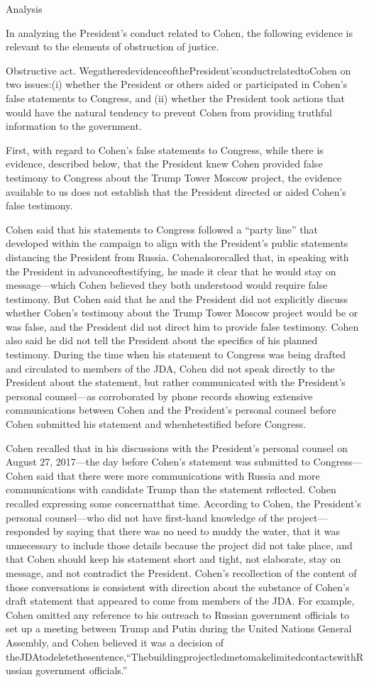 {Analysis

In analyzing the President's conduct related to Cohen, the following evidence is relevant to the elements of obstruction of justice.

Obstructive act.
WegatheredevidenceofthePresident'sconductrelatedtoCohen on two issues:(i) whether the President or others aided or participated in Cohen's false statements to Congress, and (ii) whether the President took actions that would have the natural tendency to prevent Cohen from providing truthful information to the government.

First, with regard to Cohen's false statements to Congress, while there is evidence, described below, that the President knew Cohen provided false testimony to Congress about the Trump Tower Moscow project, the evidence available to us does not establish that the President directed or aided Cohen's false testimony.

Cohen said that his statements to Congress followed a “party line” that developed within the campaign to align with the President's public statements distancing the President from Russia.
Cohenalsorecalled that, in speaking with the President in advanceoftestifying, he made it clear that he would stay on message—which Cohen believed they both understood would require false testimony.
But Cohen said that he and the President did not explicitly discuss whether Cohen's testimony about the Trump Tower Moscow project would be or was false, and the President did not direct him to provide false testimony.
Cohen also said he did not tell the President about the specifics of his planned testimony.
During the time when his statement to Congress was being drafted and circulated to members of the JDA, Cohen did not speak directly to the President about the statement, but rather communicated with the President's personal counsel—as corroborated by phone records showing extensive communications between Cohen and the President's personal counsel before Cohen submitted his statement and whenhetestified before Congress.

Cohen recalled that in his discussions with the President's personal counsel on August 27, 2017—the day before Cohen's statement was submitted to Congress—Cohen said that there were more communications with Russia and more communications with candidate Trump than the statement reflected.
Cohen recalled expressing some concernatthat time.
According to Cohen, the President's personal counsel—who did not have first-hand knowledge of the project— responded by saying that there was no need to muddy the water, that it was unnecessary to include those details because the project did not take place, and that Cohen should keep his statement short and tight, not elaborate, stay on message, and not contradict the President.
Cohen's recollection of the content of those conversations is consistent with direction about the substance of Cohen's draft statement that appeared to come from members of the JDA.
For example, Cohen omitted any reference to his outreach to Russian government officials to set up a meeting between Trump and Putin during the United Nations General Assembly, and Cohen believed it was a decision of theJDAtodeletethesentence,“ThebuildingprojectledmetomakelimitedcontactswithRussian government officials.”

}
